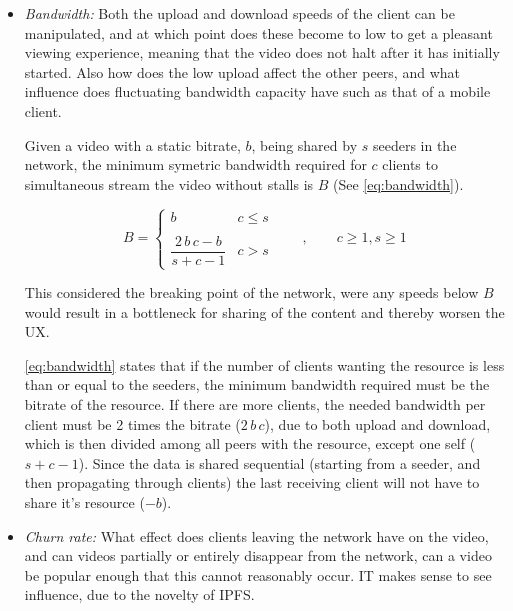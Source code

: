 \begin{itemize}
    \item \textit{Bandwidth:}
    Both the upload and download speeds of the client can be manipulated, and at which point does these become to low to get a pleasant viewing experience, meaning that the video does not halt after it has initially started. Also how does the low upload affect the other peers, and what influence does fluctuating bandwidth capacity have such as that of a mobile client.
    
    Given a video with a static bitrate, $b$, being shared by $s$ seeders in the network, the minimum symetric bandwidth required for $c$ clients to simultaneous stream the video without stalls is $B$ (See \autoref{eq:bandwidth}).
    
    \begin{equation} \label{eq:bandwidth}
        B = 
        \begin{cases}
            b   &   c \leq s
        \\ \\
            \dfrac{2 \, b \, c - b}{s + c - 1}  &  c > s
        \end{cases}
        \qquad , \qquad 
        c \geq 1 ,
        s \geq 1 
    \end{equation}
    
    This considered the breaking point of the network, were any speeds below $B$ would result in a bottleneck for sharing of the content and thereby worsen the \ac{UX}.
    
    \autoref{eq:bandwidth} states that if the number of clients wanting the resource is less than or equal to the seeders, the minimum bandwidth required must be the bitrate of the resource. 
    If there are more clients, the needed bandwidth per client must be 2 times the bitrate ($2 \, b \, c$), due to both upload and download, which is then divided among all peers with the resource, except one self ($s+c-1$).
    Since the data is shared sequential (starting from a seeder, and then propagating through clients) the last receiving client will not have to share it's resource ($-b$). 
    
    \item \textit{Churn rate:}
    What effect does clients leaving the network have on the video, and can videos partially or entirely disappear from the network, can a video be popular enough that this cannot reasonably occur. IT makes sense to see influence, due to the novelty of IPFS.
   

\end{itemize}
